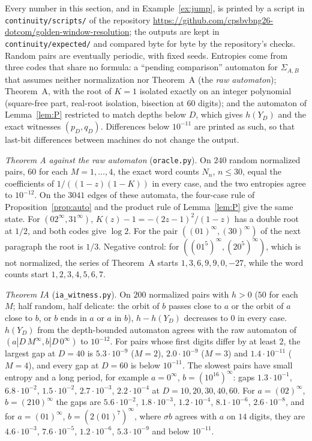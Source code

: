 \documentclass[11pt]{amsart}
\theoremstyle{definition}
\theoremstyle{remark}
\begin{document}
Every number in this section, and in Example~\ref{ex:jump}, is printed by a script in \texttt{continuity/scripts/} of the repository \url{https://github.com/cpsbvbng26-dotcom/golden-window-resolution}; the outputs are kept in \texttt{continuity/expected/} and compared byte for byte by the repository's checks. Random pairs are eventually periodic, with fixed seeds. Entropies come from three codes that share no formula: a ``pending comparison'' automaton for $\Sigma_{A,B}$ that assumes neither normalization nor Theorem~A (the \emph{raw automaton}); Theorem~A, with the root of $K=1$ isolated exactly on an integer polynomial (square-free part, real-root isolation, bisection at $60$ digits); and the automaton of Lemma~\ref{lem:P} restricted to match depths below $D$, which gives $h(Y_D)$ and the exact witnesses $(p_D,q_D)$. Differences below $10^{-11}$ are printed as such, so that last-bit differences between machines do not change the output.

\emph{Theorem A against the raw automaton} (\texttt{oracle.py}). On $240$ random normalized pairs, $60$ for each $M=1,\dots,4$, the exact word counts $N_n$, $n\le30$, equal the coefficients of $1/((1-z)(1-K))$ in every case, and the two entropies agree to $10^{-12}$. On the $3041$ edges of these automata, the four-case rule of Proposition~\ref{prop:auto} and the product rule of Lemma~\ref{lem:P} give the same state. For $(02^\infty,31^\infty)$, $K(z)-1=-(2z-1)^2/(1-z)$ has a double root at $1/2$, and both codes give $\log2$. For the pair $((01)^\infty,(30)^\infty)$ of the next paragraph the root is $1/3$. Negative control: for $((01^5)^\infty,(20^5)^\infty)$, which is not normalized, the series of Theorem~A starts $1,3,6,9,9,0,-27$, while the word counts start $1,2,3,4,5,6,7$.

\emph{Theorem IA} (\texttt{ia\_witness.py}). On $200$ normalized pairs with $h>0$ ($50$ for each $M$; half random, half delicate: the orbit of $b$ passes close to $a$ or the orbit of $a$ close to $b$, or $b$ ends in $a$ or $a$ in $b$), $h-h(Y_D)$ decreases to $0$ in every case. $h(Y_D)$ from the depth-bounded automaton agrees with the raw automaton of $(a|D\,M^\infty,b|D\,0^\infty)$ to $10^{-12}$. For pairs whose first digits differ by at least $2$, the largest gap at $D=40$ is $5.3\cdot10^{-9}$ ($M=2$), $2.0\cdot10^{-9}$ ($M=3$) and $1.4\cdot10^{-11}$ ($M=4$), and every gap at $D=60$ is below $10^{-11}$. The slowest pairs have small entropy and a long period, for example $a=0^\infty$, $b=(10^{16})^\infty$: gaps $1.3\cdot10^{-1}$, $6.8\cdot10^{-2}$, $1.5\cdot10^{-2}$, $2.7\cdot10^{-3}$, $2.2\cdot10^{-4}$ at $D=10,20,30,40,60$. For $a=(02)^\infty$, $b=(210)^\infty$ the gaps are $5.6\cdot10^{-2}$, $1.8\cdot10^{-3}$, $1.2\cdot10^{-4}$, $8.1\cdot10^{-6}$, $2.6\cdot10^{-8}$, and for $a=(01)^\infty$, $b=(2(01)^7)^\infty$, where $\sigma b$ agrees with $a$ on $14$ digits, they are $4.6\cdot10^{-3}$, $7.6\cdot10^{-5}$, $1.2\cdot10^{-6}$, $5.3\cdot10^{-9}$ and below $10^{-11}$.
\end{document}
